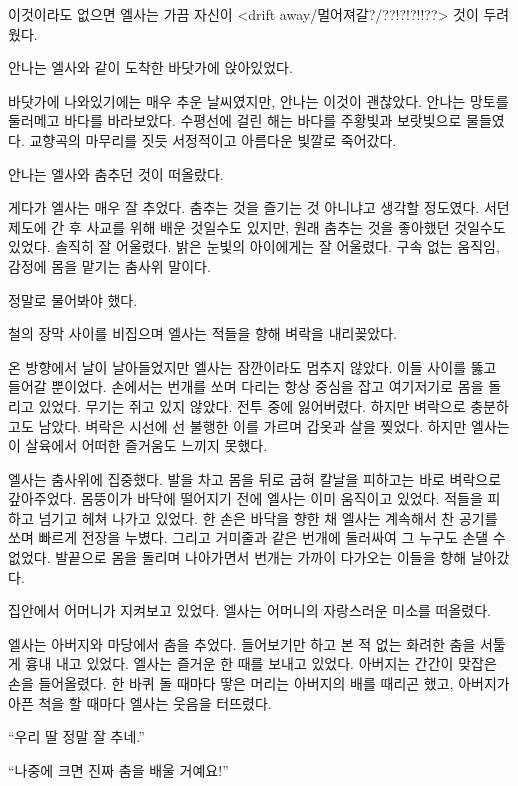 이것이라도 없으면 엘사는 가끔 자신이 <drift away/멀어져갈?/??!?!?!!??> 것이 두려웠다.

\textbreak

안나는 엘사와 같이 도착한 바닷가에 앉아있었다.

바닷가에 나와있기에는 매우 추운 날씨였지만, 안나는 이것이 괜찮았다. 안나는 망토를 둘러메고 바다를 바라보았다. 수평선에 걸린 해는 바다를 주황빛과 보랏빛으로 물들였다. 교향곡의 마무리를 짓듯 서정적이고 아름다운 빛깔로 죽어갔다.

안나는 엘사와 춤추던 것이 떠올랐다.

게다가 엘사는 매우 잘 추었다. 춤추는 것을 즐기는 것 아니냐고 생각할 정도였다. 서던 제도에 간 후 사교를 위해 배운 것일수도 있지만, 원래 춤추는 것을 좋아했던 것일수도 있었다. 솔직히 잘 어울렸다. 밝은 눈빛의 아이에게는 잘 어울렸다. 구속 없는 움직임, 감정에 몸을 맡기는 춤사위 말이다.

정말로 물어봐야 했다.

\textbreak

철의 장막 사이를 비집으며 엘사는 적들을 향해 벼락을 내리꽂았다.

온 방향에서 날이 날아들었지만 엘사는 잠깐이라도 멈추지 않았다. 이들 사이를 뚫고 들어갈 뿐이었다. 손에서는 번개를 쏘며 다리는 항상 중심을 잡고 여기저기로 몸을 돌리고 있었다. 무기는 쥐고 있지 않았다. 전투 중에 잃어버렸다. 하지만 벼락으로 충분하고도 남았다. 벼락은 시선에 선 불행한 이를 가르며 갑옷과 살을 찢었다. 하지만 엘사는 이 살육에서 어떠한 즐거움도 느끼지 못했다.

엘사는 춤사위에 집중했다. 발을 차고 몸을 뒤로 굽혀 칼날을 피하고는 바로 벼락으로 갚아주었다. 몸뚱이가 바닥에 떨어지기 전에 엘사는 이미 움직이고 있었다. 적들을 피하고 넘기고 헤쳐 나가고 있었다. 한 손은 바닥을 향한 채 엘사는 계속해서 찬 공기를 쏘며 빠르게 전장을 누볐다. 그리고 거미줄과 같은 번개에 둘러싸여 그 누구도 손댈 수 없었다. 발끝으로 몸을 돌리며 나아가면서 번개는 가까이 다가오는 이들을 향해 날아갔다.

집안에서 어머니가 지켜보고 있었다. 엘사는 어머니의 자랑스러운 미소를 떠올렸다.

엘사는 아버지와 마당에서 춤을 추었다. 들어보기만 하고 본 적 없는 화려한 춤을 서툴게 흉내 내고 있었다. 엘사는 즐거운 한 때를 보내고 있었다. 아버지는 간간이 맞잡은 손을 들어올렸다. 한 바퀴 돌 때마다 땋은 머리는 아버지의 배를 때리곤 했고, 아버지가 아픈 척을 할 때마다 엘사는 웃음을 터뜨렸다.

``우리 딸 정말 잘 추네.''

``나중에 크면 진짜 춤을 배울 거예요!''

